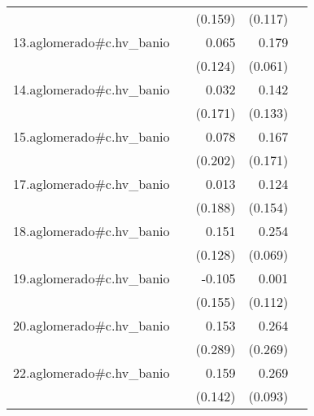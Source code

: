 {\begin{longtable}{l*{4}{D{.}{.}{-1}}}
            &                     &     (0.159)         &     (0.117)         &                     \\
\addlinespace
13.aglomerado#c.hv\_banio&                     &       0.065         &       0.179\sym{**} &                     \\
            &                     &     (0.124)         &     (0.061)         &                     \\
\addlinespace
14.aglomerado#c.hv\_banio&                     &       0.032         &       0.142         &                     \\
            &                     &     (0.171)         &     (0.133)         &                     \\
\addlinespace
15.aglomerado#c.hv\_banio&                     &       0.078         &       0.167         &                     \\
            &                     &     (0.202)         &     (0.171)         &                     \\
\addlinespace
17.aglomerado#c.hv\_banio&                     &       0.013         &       0.124         &                     \\
            &                     &     (0.188)         &     (0.154)         &                     \\
\addlinespace
18.aglomerado#c.hv\_banio&                     &       0.151         &       0.254\sym{***}&                     \\
            &                     &     (0.128)         &     (0.069)         &                     \\
\addlinespace
19.aglomerado#c.hv\_banio&                     &      -0.105         &       0.001         &                     \\
            &                     &     (0.155)         &     (0.112)         &                     \\
\addlinespace
20.aglomerado#c.hv\_banio&                     &       0.153         &       0.264         &                     \\
            &                     &     (0.289)         &     (0.269)         &                     \\
\addlinespace
22.aglomerado#c.hv\_banio&                     &       0.159         &       0.269\sym{**} &                     \\
            &                     &     (0.142)         &     (0.093)         &                     \\

\end{longtable}}
